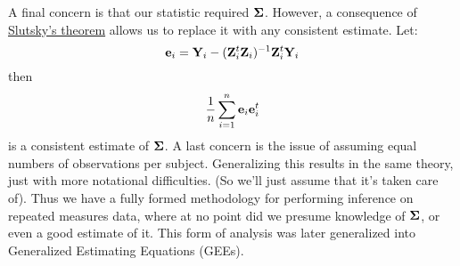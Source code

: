 A final concern is that our statistic required $\boldsymbol{\Sigma}$. However, a consequence of 
\href{https://en.wikipedia.org/wiki/Slutsky\%27s_theorem}{Slutsky's theorem} allows
us to replace it with any consistent estimate. Let:
$$
\mathbf{e}_i = \mathbf{Y}_i - (\mathbf{Z}_i^t \mathbf{Z}_i)^{-1} \mathbf{Z}_i^t \mathbf{Y}_i 
$$
then 
$$
\frac{1}{n} \sum_{i=1}^n \mathbf{e}_i \mathbf{e}_i^t
$$
is a consistent estimate of $\boldsymbol{\Sigma}$. A last concern is the issue of assuming equal
numbers of observations per subject. Generalizing this results in the same theory, just with more
notational difficulties. (So we'll just assume that it's taken care of). 
Thus we have a fully formed methodology for
performing inference on repeated measures data, where at no point did we presume
knowledge of $\boldsymbol{\Sigma}$, or even a good estimate of it. This form of analysis 
was later generalized into Generalized Estimating Equations (GEEs). 





